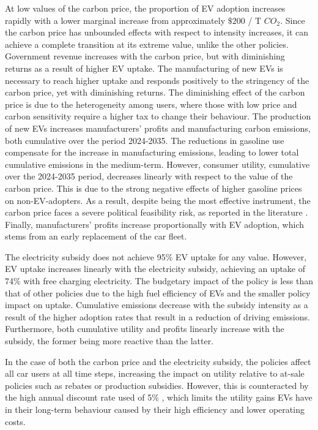 \documentclass[12pt]{article}
\begin{document}
	At low values of the carbon price, the proportion of EV adoption increases rapidly with a lower marginal increase from approximately $\$200$ / T $CO_2$. Since the carbon price has unbounded effects with respect to intensity increases, it can achieve a complete transition at its extreme value, unlike the other policies. Government revenue increases with the carbon price, but with diminishing returns as a result of higher EV uptake. The manufacturing of new EVs is necessary to reach higher uptake and responds positively to the stringency of the carbon price, yet with diminishing returns. The diminishing effect of the carbon price is due to the heterogeneity among users, where those with low price and carbon sensitivity require a higher tax to change their behaviour. The production of new EVs increases manufacturers' profits and manufacturing carbon emissions, both cumulative over the period 2024-2035. The reductions in gasoline use compensate for the increase in manufacturing emissions, leading to lower total cumulative emissions in the medium-term. However, consumer utility, cumulative over the 2024-2035 period, decreases linearly with respect to the value of the carbon price. This is due to the strong negative effects of higher gasoline prices on non-EV-adopters. As a result, despite being the most effective instrument, the carbon price faces a severe political feasibility risk, as reported in the literature \citep{maestre-andres_perceived_2019,savin2024carbon,mayol_analysis_2025}. Finally, manufacturers' profits increase proportionally with EV adoption, which stems from an early replacement of the car fleet.

	The electricity subsidy does not achieve 95\% EV uptake for any value. However, EV uptake increases linearly with the electricity subsidy, achieving an uptake of 74\% with free charging electricity. The budgetary impact of the policy is less than that of other policies due to the high fuel efficiency of EVs and the smaller policy impact on uptake. Cumulative emissions decrease with the subsidy intensity as a result of the higher adoption rates that result in a reduction of driving emissions. Furthermore, both cumulative utility and profits linearly increase with the subsidy, the former being more reactive than the latter.

	In the case of both the carbon price and the electricity subsidy, the policies affect all car users at all time steps, increasing the impact on utility relative to at-sale policies such as rebates or production subsidies. However, this is counteracted by the high annual discount rate used of 5\% \citep{busse2013consumers, greene2010consumers}, which limits the utility gains EVs have in their long-term behaviour caused by their high efficiency and lower operating costs.
\end{document}
